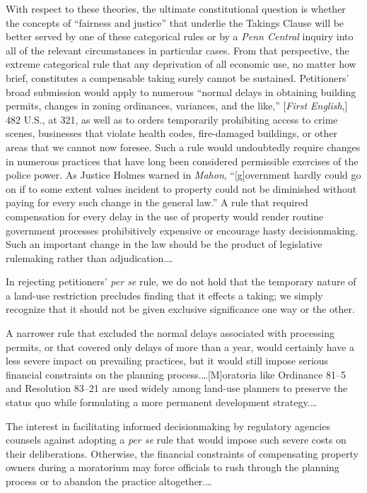 With respect to these theories, the ultimate constitutional question is whether
the concepts of ``fairness and justice'' that underlie the Takings Clause will
be better served by one of these categorical rules or by a \textit{Penn Central}
inquiry into all of the relevant circumstances in particular cases. From that
perspective, the extreme categorical rule that any deprivation of all economic
use, no matter how brief, constitutes a compensable taking surely cannot be
sustained. Petitioners' broad submission would apply to numerous ``normal delays
in obtaining building permits, changes in zoning ordinances, variances, and the
like,'' [\textit{First English},] 482 U.S., at 321, as well as to orders
temporarily prohibiting access to crime scenes, businesses that violate health
codes, fire-damaged buildings, or other areas that we cannot now foresee. Such a
rule would undoubtedly require changes in numerous practices that have long been
considered permissible exercises of the police power. As Justice Holmes warned
in \textit{Mahon}, ``[g]overnment hardly could go on if to some extent values
incident to property could not be diminished without paying for every such
change in the general law.'' A rule that required compensation for every delay
in the use of property would render routine government processes prohibitively
expensive or encourage hasty decisionmaking. Such an important change in the law
should be the product of legislative rulemaking rather than adjudication.\ldots

In rejecting petitioners' \textit{per se} rule, we do not hold that the
temporary nature of a land-use restriction precludes finding that it effects a
taking; we simply recognize that it should not be given exclusive significance
one way or the other.

A narrower rule that excluded the normal delays associated with processing
permits, or that covered only delays of more than a year, would certainly have a
less severe impact on prevailing practices, but it would still impose serious
financial constraints on the planning process.\ldots [M]oratoria like Ordinance
81--5 and Resolution 83--21 are used widely among land-use planners to preserve
the status quo while formulating a more permanent development strategy.\ldots 

The interest in facilitating informed decisionmaking by regulatory agencies
counsels against adopting a \textit{per se} rule that would impose such severe
costs on their deliberations. Otherwise, the financial constraints of
compensating property owners during a moratorium may force officials to rush
through the planning process or to abandon the practice altogether.\ldots

